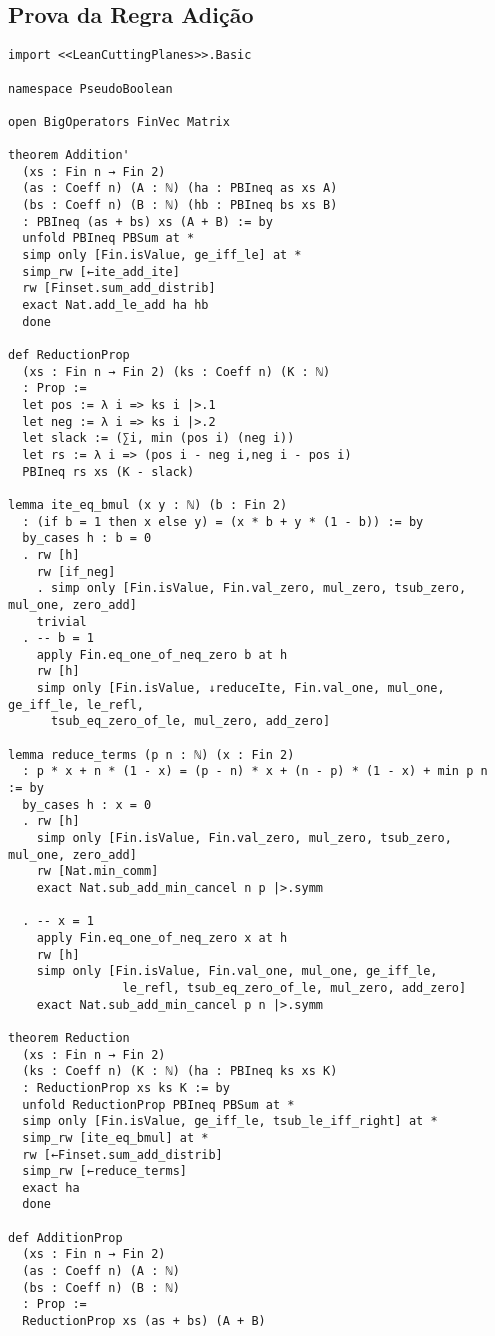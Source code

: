 \documentclass[conference]{IEEEtran}
\begin{document}
\subsection{Prova da Regra Adição}
\begin{verbatim}
import <<LeanCuttingPlanes>>.Basic

namespace PseudoBoolean

open BigOperators FinVec Matrix

theorem Addition'
  (xs : Fin n → Fin 2)
  (as : Coeff n) (A : ℕ) (ha : PBIneq as xs A)
  (bs : Coeff n) (B : ℕ) (hb : PBIneq bs xs B)
  : PBIneq (as + bs) xs (A + B) := by
  unfold PBIneq PBSum at *
  simp only [Fin.isValue, ge_iff_le] at *
  simp_rw [←ite_add_ite]
  rw [Finset.sum_add_distrib]
  exact Nat.add_le_add ha hb
  done

def ReductionProp
  (xs : Fin n → Fin 2) (ks : Coeff n) (K : ℕ)
  : Prop :=
  let pos := λ i => ks i |>.1
  let neg := λ i => ks i |>.2
  let slack := (∑i, min (pos i) (neg i))
  let rs := λ i => (pos i - neg i,neg i - pos i)
  PBIneq rs xs (K - slack)

lemma ite_eq_bmul (x y : ℕ) (b : Fin 2)
  : (if b = 1 then x else y) = (x * b + y * (1 - b)) := by
  by_cases h : b = 0
  . rw [h]
    rw [if_neg]
    . simp only [Fin.isValue, Fin.val_zero, mul_zero, tsub_zero, mul_one, zero_add]
    trivial
  . -- b = 1
    apply Fin.eq_one_of_neq_zero b at h
    rw [h]
    simp only [Fin.isValue, ↓reduceIte, Fin.val_one, mul_one, ge_iff_le, le_refl,
      tsub_eq_zero_of_le, mul_zero, add_zero]

lemma reduce_terms (p n : ℕ) (x : Fin 2)
  : p * x + n * (1 - x) = (p - n) * x + (n - p) * (1 - x) + min p n  := by
  by_cases h : x = 0
  . rw [h]
    simp only [Fin.isValue, Fin.val_zero, mul_zero, tsub_zero, mul_one, zero_add]
    rw [Nat.min_comm]
    exact Nat.sub_add_min_cancel n p |>.symm

  . -- x = 1
    apply Fin.eq_one_of_neq_zero x at h
    rw [h]
    simp only [Fin.isValue, Fin.val_one, mul_one, ge_iff_le,
                le_refl, tsub_eq_zero_of_le, mul_zero, add_zero]
    exact Nat.sub_add_min_cancel p n |>.symm

theorem Reduction
  (xs : Fin n → Fin 2)
  (ks : Coeff n) (K : ℕ) (ha : PBIneq ks xs K)
  : ReductionProp xs ks K := by
  unfold ReductionProp PBIneq PBSum at *
  simp only [Fin.isValue, ge_iff_le, tsub_le_iff_right] at *
  simp_rw [ite_eq_bmul] at *
  rw [←Finset.sum_add_distrib]
  simp_rw [←reduce_terms]
  exact ha
  done

def AdditionProp
  (xs : Fin n → Fin 2)
  (as : Coeff n) (A : ℕ)
  (bs : Coeff n) (B : ℕ)
  : Prop :=
  ReductionProp xs (as + bs) (A + B)


\end{verbatim}
\end{document}
